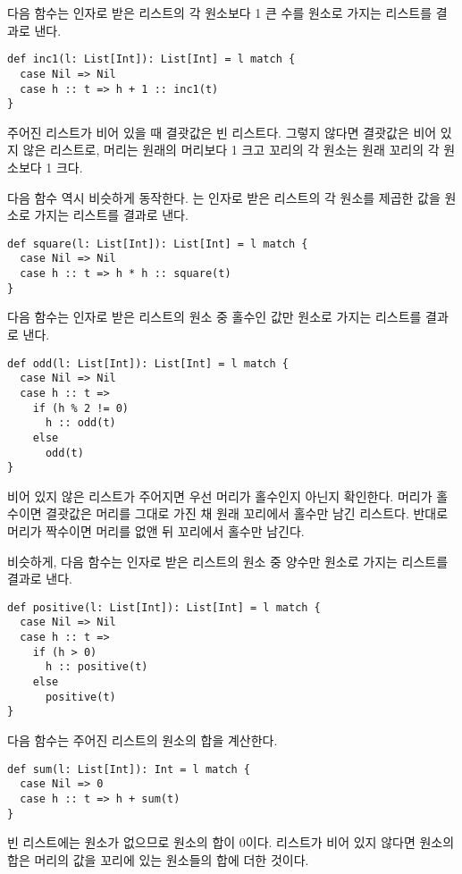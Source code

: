 다음 함수는 인자로 받은 리스트의 각 원소보다 1 큰 수를 원소로 가지는 리스트를
결과로 낸다.

\begin{verbatim}
def inc1(l: List[Int]): List[Int] = l match {
  case Nil => Nil
  case h :: t => h + 1 :: inc1(t)
}
\end{verbatim}

주어진 리스트가 비어 있을 때 결괏값은 빈 리스트다. 그렇지 않다면 결괏값은 비어
있지 않은 리스트로, 머리는 원래의 머리보다 1 크고 꼬리의 각 원소는 원래 꼬리의
각 원소보다 1 크다.

다음 함수  역시 비슷하게 동작한다. 는 인자로 받은 리스트의 각 원소를
제곱한 값을 원소로 가지는 리스트를 결과로 낸다.

\begin{verbatim}
def square(l: List[Int]): List[Int] = l match {
  case Nil => Nil
  case h :: t => h * h :: square(t)
}
\end{verbatim}

다음 함수는 인자로 받은 리스트의 원소 중 홀수인 값만 원소로 가지는 리스트를
결과로 낸다.

\begin{verbatim}
def odd(l: List[Int]): List[Int] = l match {
  case Nil => Nil
  case h :: t =>
    if (h % 2 != 0)
      h :: odd(t)
    else
      odd(t)
}
\end{verbatim}

비어 있지 않은 리스트가 주어지면 우선 머리가 홀수인지 아닌지 확인한다. 머리가
홀수이면 결괏값은 머리를 그대로 가진 채 원래 꼬리에서 홀수만 남긴 리스트다.
반대로 머리가 짝수이면 머리를 없앤 뒤 꼬리에서 홀수만 남긴다.

비슷하게, 다음 함수는 인자로 받은 리스트의 원소 중 양수만 원소로 가지는 리스트를
결과로 낸다.

\begin{verbatim}
def positive(l: List[Int]): List[Int] = l match {
  case Nil => Nil
  case h :: t =>
    if (h > 0)
      h :: positive(t)
    else
      positive(t)
}
\end{verbatim}

다음 함수는 주어진 리스트의 원소의 합을 계산한다.

\begin{verbatim}
def sum(l: List[Int]): Int = l match {
  case Nil => 0
  case h :: t => h + sum(t)
}
\end{verbatim}

빈 리스트에는 원소가 없으므로 원소의 합이 0이다. 리스트가 비어 있지 않다면
원소의 합은 머리의 값을 꼬리에 있는 원소들의 합에 더한 것이다.

